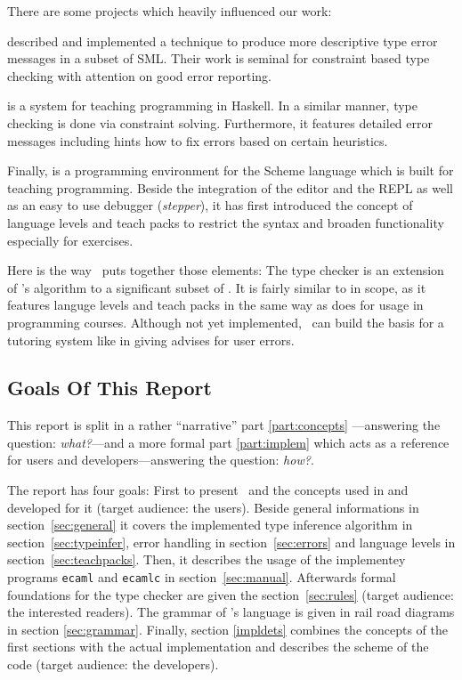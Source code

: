 There are some projects which heavily influenced our work:

\citet{haackwells04} described and implemented a technique to produce more
descriptive type error messages in a subset of SML.  
Their work is seminal for constraint based type checking with attention 
on good error reporting.

 \citep{helium-hw03} is a system for teaching programming 
in Haskell. In a similar manner, type checking is done via constraint 
solving. Furthermore, it features detailed error messages including 
hints how to fix errors based on certain heuristics.

Finally,  \citep{Felleisen98thedrscheme} is a programming 
environment for the Scheme language which is built for teaching
programming.  Beside the integration of the editor and the REPL as well as an
easy to use debugger (\emph{stepper}), it has first introduced the concept of language
levels and teach packs to restrict the syntax and broaden functionality
especially for exercises.

Here is the way \easyocaml\ puts together those elements: The type checker is an
extension of \citet{haackwells04}'s  algorithm to a significant subset of
\ocaml. It is fairly similar to  in scope, as it features languge levels
and teach packs in the same way as  does for usage in programming
courses. Although not yet implemented, \easyocaml\ can build the basis for a
tutoring system like  in giving advises for user errors.


\subsection*{Goals Of This Report}

This report is split in a rather ``narrative'' part \ref{part:concepts}%
---answering the question: \emph{what?}---and a more formal part \ref{part:implem}
which acts as a reference for users and developers---answering the question:
\emph{how?}.

The report has four goals:
First to present \easyocaml\ and the concepts used in and developed for it
(target audience: the users). Beside general informations in
section~\ref{sec:general} it covers the implemented type inference algorithm in
section~\ref{sec:typeinfer}, error handling in section~\ref{sec:errors} and
language levels in section~\ref{sec:teachpacks}.
Then, it describes the usage of the implementey programs \texttt{ecaml} and
\texttt{ecamlc} in section~\ref{sec:manual}.
Afterwards formal foundations for the type checker are given the
section~\ref{sec:rules} (target audience: the interested readers).
The grammar of \easyocaml's language is given in rail road diagrams in section
\ref{sec:grammar}.
Finally, section \ref{impldets} combines the concepts of the first sections with
the actual implementation and describes the scheme of the code (target audience:
the developers).

